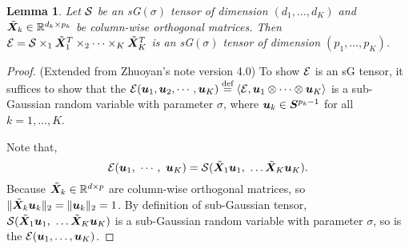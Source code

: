 \documentclass[11pt]{article}
\theoremstyle{plain}
\newtheorem{lem}{Lemma}
\theoremstyle{definition}
\begin{document}
\begin{lem} \label{lem:sub}
Let $\mathcal{S}$ be an sG$(\sigma)$ tensor of dimension $(d_1,\ldots,d_K)$ and $\tilde {\bm X}_k\in\mathbb{R}^{d_k\times p_k}$ be column-wise orthogonal matrices. Then $\mathcal{E}=\mathcal{S} \times_1 \tilde {\bm X}^T_1\times_2\cdots\times_K \tilde {\bm X}^T_K$ is an sG$(\sigma)$ tensor of dimension $(p_1,\ldots,p_K)$.
\end{lem}

\begin{proof} (Extended from Zhuoyan's note version 4.0)
To show $\mathcal{E}$ is an sG tensor, it suffices to show that the $\mathcal{E}(\bm{u}_1, \bm{u}_2, \cdots, \bm{u}_K)\stackrel{\text{def}}{=}\langle\mathcal{E}, \bm{u}_1\otimes \cdots\otimes \bm{u}_K \rangle$ is a sub-Gaussian random variable with parameter $\sigma$, where $\bm{u}_k\in\bm S^{p_k-1}$ for all $k=1,\ldots,K$.

Note that, 
\[
\mathcal{E}(\bm{u}_1,\ \cdots,\ \bm{u}_K )=\mathcal{S}(\tilde {\bm X}_1\bm{u}_1,\ \ldots \tilde {\bm X}_K\bm{u}_K).
\]
Because $\tilde {\bm X}_k\in\mathbb{R}^{d\times p}$ are column-wise orthogonal matrices, so $\lVert\tilde {\bm X}_k\bm{u}_k\rVert_2=\lVert\bm{u}_k\rVert_2=1$. By definition of sub-Gaussian tensor, $\tS(\tilde \mX_1\bmu_1,\ \ldots \tilde \mX_K\bmu_K)$ is a sub-Gaussian random variable with parameter $\sigma$, so is the $\mathcal{E}(\bm{u}_1,\ldots,\bm{u}_K)$. 
\end{proof}
\end{document}
